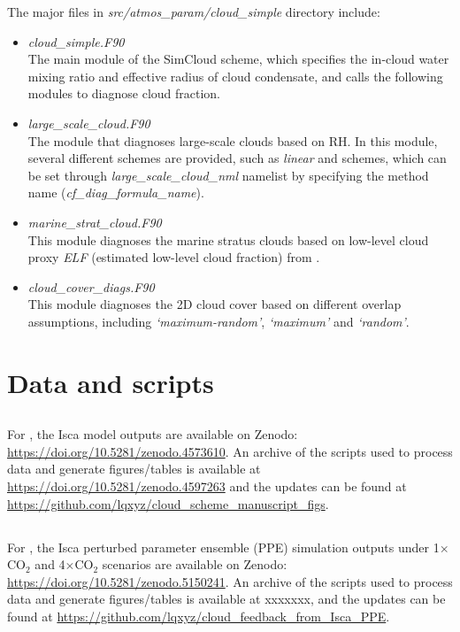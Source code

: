 The major files in \textit{src/atmos\_param/cloud\_simple} directory include:
\begin{itemize}
    \item \textit{cloud\_simple.F90} \\
    The main module of the SimCloud scheme, which specifies the in-cloud water mixing ratio and effective radius of cloud condensate, and calls the following modules to diagnose cloud fraction.
    
    \item \textit{large\_scale\_cloud.F90}\\
    The module that diagnoses large-scale clouds based on RH. In this module, several different schemes are provided, such as \textit{linear} and \textit{\cite{Sundqvist1989}} schemes, which can be set through \textit{large\_scale\_cloud\_nml} namelist by specifying the method name (\textit{cf\_diag\_formula\_name}).
    
    \item \textit{marine\_strat\_cloud.F90}\\
    This module diagnoses the marine stratus clouds based on low-level cloud proxy \textit{ELF} (estimated low-level cloud fraction) from \cite{Park2019}.

    \item \textit{cloud\_cover\_diags.F90}\\
    This module diagnoses the 2D cloud cover based on different overlap assumptions, including \textit{`maximum-random'}, \textit{`maximum'} and \textit{`random'}.
\end{itemize}

\section{Data and scripts}

\subsection{}

For , the Isca model outputs are available on Zenodo: \url{https://doi.org/10.5281/zenodo.4573610}. An archive of the scripts used to process data and generate figures/tables is available at \url{https://doi.org/10.5281/zenodo.4597263} and the updates can be found at \url{https://github.com/lqxyz/cloud_scheme_manuscript_figs}.

\subsection{}

For , the Isca perturbed parameter ensemble (PPE) simulation outputs under 1$\times$CO$_2$ and 4$\times$CO$_2$ scenarios are available on Zenodo: \url{https://doi.org/10.5281/zenodo.5150241}. An archive of the scripts used to process data and generate figures/tables is available at xxxxxxx, and the updates can be found at \url{https://github.com/lqxyz/cloud_feedback_from_Isca_PPE}.
